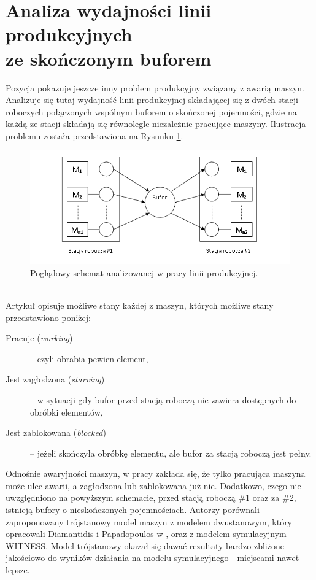 \documentclass[archivemode]{mgr}
\begin{document}
\section[Analiza wydajności linii produkcyjnych ze skończonym buforem]{Analiza wydajności linii produkcyjnych\\ ze skończonym buforem}
Pozycja \cite{MSTAWFB} pokazuje jeszcze inny problem produkcyjny związany z awarią maszyn. Analizuje się tutaj wydajność linii produkcyjnej składającej się z dwóch stacji roboczych połączonych wspólnym buforem o skończonej pojemności, gdzie na każdą ze stacji składają się równolegle niezależnie pracujące maszyny. Ilustracja problemu została przedstawiona na Rysunku \ref{rys_bufor}.
\begin{figure}[!ht]
\begin{center}
\includegraphics[scale=1.0,width=16cm]{rysunki/bufor.png}
\caption{Poglądowy schemat analizowanej w pracy \cite{MSTAWFB} linii produkcyjnej.}
\label{rys_bufor}
\end{center}
\end{figure}\\
Artykuł opisuje możliwe stany każdej z maszyn, których możliwe stany przedstawiono poniżej:
\begin{description}
    \item[Pracuje (\emph{working})]-- czyli obrabia pewien element,
    \item[Jest zagłodzona (\emph{starving})]-- w sytuacji gdy bufor przed stacją roboczą nie zawiera dostępnych do obróbki elementów,
    \item[Jest zablokowana (\emph{blocked})]-- jeżeli skończyła obróbkę elementu, ale bufor za stacją roboczą jest pełny.
\end{description}
Odnośnie awaryjności maszyn, w pracy zakłada się, że tylko pracująca maszyna może ulec awarii, a zagłodzona lub zablokowana już nie. Dodatkowo, czego nie uwzględniono na powyższym schemacie, przed stacją roboczą \#1 oraz za \#2, istnieją bufory o nieskończonych pojemnościach. Autorzy porównali zaproponowany trójstanowy model maszyn z modelem dwustanowym, który opracowali Diamantidis i Papadopoulos w \cite{Diamantidis2009}, oraz z modelem symulacyjnym WITNESS. Model trójstanowy okazał się dawać rezultaty bardzo zbliżone jakościowo do wyników działania na modelu symulacyjnego - miejscami nawet lepsze.
%
\end{document}
